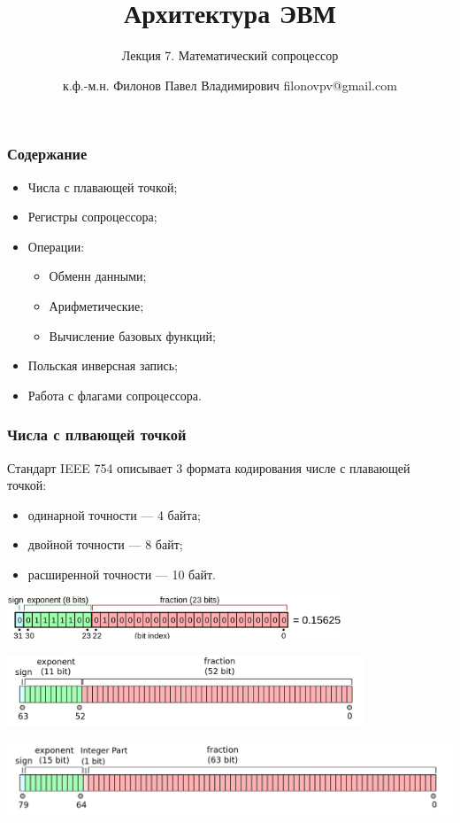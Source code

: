 \documentclass[utf8, russian, aspectratio=1610]{beamer}
\title{Архитектура ЭВМ}
\subtitle{Лекция 7. Математический сопроцессор}
\author{к.ф.-м.н. Филонов Павел Владимирович \newline filonovpv@gmail.com}
\date{}
\institute[МГТУ ГА] 
{
    Московский Государственный Технический Университет \\
    Гражданской Авиации
}
\begin{document}
\begin{frame}
    \titlepage
\end{frame}

\begin{frame}
    \frametitle{Содержание}
    \begin{itemize}
        \item Числа с плавающей точкой;
        \item Регистры сопроцессора;
        \item Операции:
        \begin{itemize}
            \item Обменн данными;
            \item Арифметические;
            \item Вычисление базовых функций;
        \end{itemize}
        \item Польская инверсная запись;
        \item Работа с флагами сопроцессора.
    \end{itemize}
\end{frame}

\begin{frame}
    \frametitle{Числа с плвающей точкой}

    Стандарт IEEE 754 описывает 3 формата кодирования числе с плавающей точкой:
    \begin{itemize}
        \item одинарной точности --- 4 байта;
        \item двойной точности --- 8 байт;
        \item расширенной точности --- 10 байт.
    \end{itemize}

    \includegraphics[width=0.75\textwidth]{fig/single.png}

    \includegraphics[width=0.8\textwidth]{fig/double.png}
    
    \includegraphics[width=1.0\textwidth]{fig/extended.png}


\end{frame}
\end{document}
